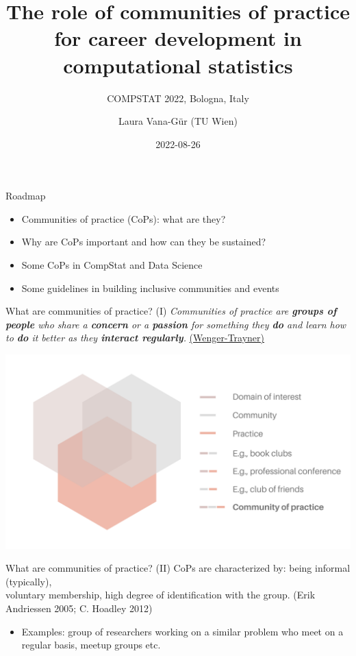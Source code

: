 \documentclass[
  ignorenonframetext,
]{beamer}
\title{The role of communities of practice for career development in
computational statistics}
\subtitle{COMPSTAT 2022, Bologna, Italy}
\author{Laura Vana-Gür (TU Wien)}
\date{2022-08-26}
\providecommand{\tightlist}{%
  \setlength{\itemsep}{0pt}\setlength{\parskip}{0pt}}
\begin{document}
\frame{\titlepage}

\begin{frame}{Roadmap}
\protect\hypertarget{roadmap}{}
\begin{itemize}
\item
  Communities of practice (CoPs): what are they? \newline
\item
  Why are CoPs important and how can they be sustained? \newline
\item
  Some CoPs in CompStat and Data Science \newline
\item
  Some guidelines in building inclusive communities and events
\end{itemize}
\end{frame}

\begin{frame}{What are communities of practice? (I)}
\protect\hypertarget{what-are-communities-of-practice-i}{}
\emph{Communities of practice are
\textbf{\textcolor[HTML]{d6d9d9}{groups of people}} who share a
\textbf{\textcolor[HTML]{d4bdba}{concern}} or a
\textbf{\textcolor[HTML]{d4bdba}{passion}} for something they
\textbf{\textcolor[HTML]{edaa98}{do}} and learn how to
\textbf{\textcolor[HTML]{edaa98}{do}} it better as they
\textbf{\textcolor[HTML]{d6d9d9}{interact regularly}}.}
\href{https://wenger-trayner.com/introduction-to-communities-of-practice}{(Wenger-Trayner)}

\includegraphics{figs/3.png}
\end{frame}

\begin{frame}{What are communities of practice? (II)}
\protect\hypertarget{what-are-communities-of-practice-ii}{}
CoPs are characterized by: being informal (typically),\\
voluntary membership, high degree of identification with the group.
(Erik Andriessen 2005; C. Hoadley 2012)

\begin{itemize}
\tightlist
\item
  Examples: group of researchers working on a similar problem who meet
  on a regular basis, meetup groups etc.
\end{itemize}
\end{frame}
\end{document}
